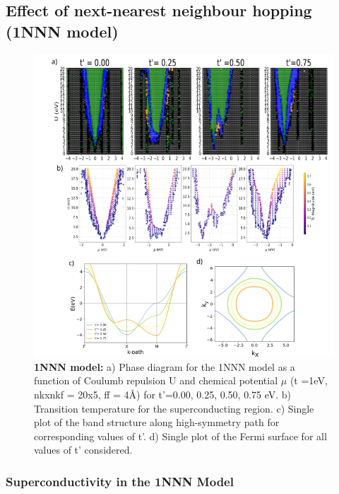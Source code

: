 \documentclass[12pt]{article}
\begin{document}
\subsection{Effect of next-nearest neighbour hopping (1NNN model)}
\label{subsec:1NNNModel}


\begin{figure}[htbp]  %
    \centering
    \includegraphics[width=1.0\textwidth]{1NNN.png}  %
    \caption{\textbf{1NNN model:} a) Phase diagram for the 1NNN model as a function of Coulumb repulsion U and chemical potential $\mu$ (t =1eV, nkxnkf = 20x5, ff = 4\AA) for t'=0.00, 0.25, 0.50, 0.75 eV. 
    b) Transition temperature for the superconducting region.
    c) Single plot of the band structure along high-symmetry path for corresponding values of t'.
    d) Single plot of the Fermi surface for all values of t' considered.}
    
    \label{fig:1NNN}
\end{figure}

\newpage

\subsubsection{Superconductivity in the 1NNN Model}
\end{document}
